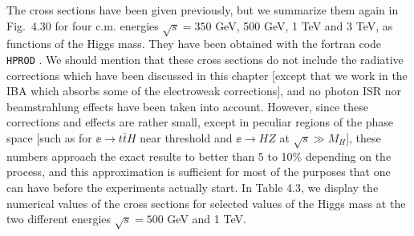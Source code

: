 {The cross sections have been given previously, but we summarize them again in
Fig.~4.30 for four c.m. energies $\sqrt{s}=350$ GeV, 500 GeV, 1 TeV and 3 TeV,
as functions of the Higgs mass. They have been obtained with the {\sc fortran}
code {\tt HPROD} \cite{HPROD}. We should mention that these cross sections do
not include the radiative corrections which have been discussed in this chapter
[except that we work in the IBA which absorbs some of the electroweak
corrections], and no photon ISR nor beamstrahlung effects have been taken into
account. However, since these corrections and effects are rather small, except
in peculiar regions of the phase space [such as for $\ee \to t\bar t H$ near
threshold and $\ee \to HZ$ at $\sqrt s \gg M_H$], these numbers approach the
exact results to better than 5 to 10\% depending on the process, and this
approximation is sufficient for most of the purposes that one can have before
the experiments actually start. In Table 4.3, we display the numerical values
of the cross sections for selected values of the Higgs mass at the two
different energies $\sqrt{s}=500$ GeV and 1 TeV.\s 

\begin{figure}[!h]
\begin{center}
\vspace*{-2.2cm}
\hspace*{-3.5cm}
\end{center}
\vspace*{-4.2cm}
\vspace*{-.6cm}
\end{figure}


}
